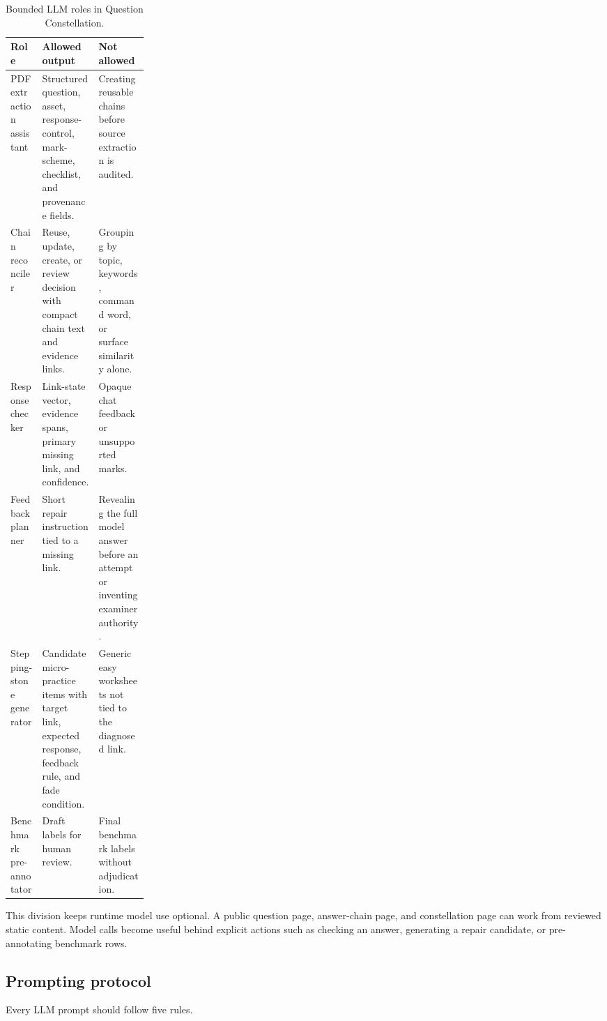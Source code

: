 \documentclass[11pt]{article}
\begin{document}
\begin{table}[H]
\centering
\small
\begin{tabularx}{\linewidth}{L{0.23\linewidth}Y Y}
\toprule
\textbf{Role} & \textbf{Allowed output} & \textbf{Not allowed}\\
\midrule
PDF extraction assistant & Structured question, asset, response-control, mark-scheme, checklist, and provenance fields. & Creating reusable chains before source extraction is audited.\\
Chain reconciler & Reuse, update, create, or review decision with compact chain text and evidence links. & Grouping by topic, keywords, command word, or surface similarity alone.\\
Response checker & Link-state vector, evidence spans, primary missing link, and confidence. & Opaque chat feedback or unsupported marks.\\
Feedback planner & Short repair instruction tied to a missing link. & Revealing the full model answer before an attempt or inventing examiner authority.\\
Stepping-stone generator & Candidate micro-practice items with target link, expected response, feedback rule, and fade condition. & Generic easy worksheets not tied to the diagnosed link.\\
Benchmark pre-annotator & Draft labels for human review. & Final benchmark labels without adjudication.\\
\bottomrule
\end{tabularx}
\caption{Bounded LLM roles in Question Constellation.}
\label{tab:llmroles}
\end{table}

This division keeps runtime model use optional. A public question page, answer-chain page, and constellation page can work from reviewed static content. Model calls become useful behind explicit actions such as checking an answer, generating a repair candidate, or pre-annotating benchmark rows.

\subsection{Prompting protocol}

Every LLM prompt should follow five rules.
\end{document}
